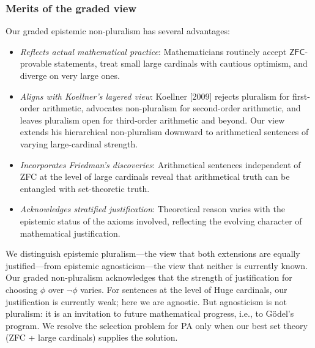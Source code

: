 \documentclass[a4paper,12pt]{amsart}
\theoremstyle{definition}
\numberwithin{equation}{section}
\begin{document}
\subsubsection{Merits of the graded view}
Our graded epistemic non-pluralism has several advantages:
\begin{itemize}
  \item \emph{Reflects actual mathematical practice}: Mathematicians routinely accept \(\mathsf{ZFC}\)-provable statements, treat small large cardinals with cautious optimism, and diverge on very large ones.
 \item \emph{Aligns with Koellner's layered view}: Koellner [2009] rejects pluralism for first-order arithmetic, advocates non-pluralism for second-order arithmetic, and leaves pluralism open for third-order arithmetic and beyond. Our view extends his hierarchical non-pluralism downward to arithmetical sentences of varying large-cardinal 
strength.
\item \emph{Incorporates Friedman's discoveries}: Arithmetical sentences 
independent of {\sf ZFC} at the level of large cardinals reveal that arithmetical 
truth can be entangled with set-theoretic truth.            
  \item \emph{Acknowledges stratified justification}: Theoretical reason varies with the epistemic status of the axioms involved, reflecting the evolving character of mathematical justification.
\end{itemize}

We distinguish epistemic pluralism---the view that both extensions are 
equally justified---from epistemic agnosticism---the view that neither 
is currently known. Our graded non-pluralism acknowledges that the 
strength of justification for choosing $\phi$ over $\neg\phi$ varies. 
For sentences at the level of Huge cardinals, our justification is 
currently weak; here we are agnostic. But agnosticism is not pluralism: 
it is an invitation to future mathematical progress, i.e., to G\"odel's 
program. We resolve the selection problem for {\sf PA} only when our best set theory ({\sf ZFC} + large cardinals) supplies the solution. 
\end{document}
